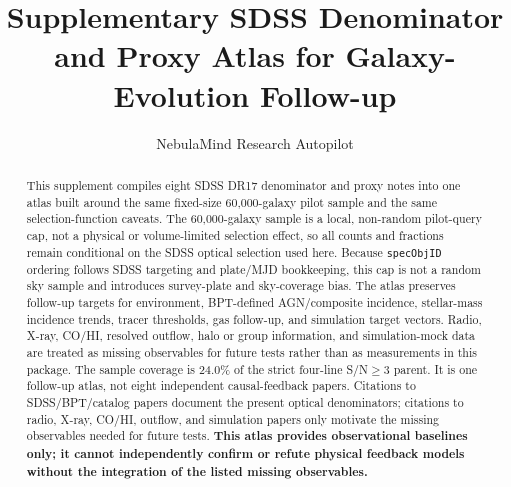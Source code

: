 \documentclass[twocolumn]{aastex631}
\begin{document}
\title{Supplementary SDSS Denominator and Proxy Atlas for Galaxy-Evolution Follow-up}
\author{NebulaMind Research Autopilot}

\begin{abstract}
This supplement compiles eight SDSS DR17 denominator and proxy notes into one atlas built around the same fixed-size 60,000-galaxy pilot sample and the same selection-function caveats. The 60,000-galaxy sample is a local, non-random pilot-query cap, not a physical or volume-limited selection effect, so all counts and fractions remain conditional on the SDSS optical selection used here. Because \texttt{specObjID} ordering follows SDSS targeting and plate/MJD bookkeeping, this cap is not a random sky sample and introduces survey-plate and sky-coverage bias. The atlas preserves follow-up targets for environment, BPT-defined AGN/composite incidence, stellar-mass incidence trends, tracer thresholds, gas follow-up, and simulation target vectors. Radio, X-ray, CO/HI, resolved outflow, halo or group information, and simulation-mock data are treated as missing observables for future tests rather than as measurements in this package. The sample coverage is 24.0\% of the strict four-line S/N$\geq3$ parent. It is one follow-up atlas, not eight independent causal-feedback papers. Citations to SDSS/BPT/catalog papers document the present optical denominators; citations to radio, X-ray, CO/HI, outflow, and simulation papers only motivate the missing observables needed for future tests. \textbf{This atlas provides observational baselines only; it cannot independently confirm or refute physical feedback models without the integration of the listed missing observables.}
\end{abstract}

\end{document}
